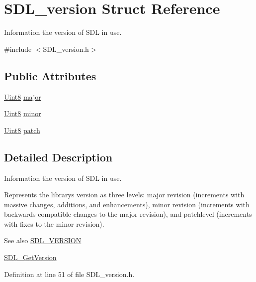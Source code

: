\hypertarget{struct_s_d_l__version}{}\section{S\+D\+L\+\_\+version Struct Reference}
\label{struct_s_d_l__version}


Information the version of S\+DL in use.  




{\ttfamily \#include $<$S\+D\+L\+\_\+version.\+h$>$}

\subsection*{Public Attributes}
\begin{DoxyCompactItemize}
\item 
\mbox{\hyperlink{_s_d_l__stdinc_8h_a2944638813a090aa23e62f4da842c3e2}{Uint8}} \mbox{\hyperlink{struct_s_d_l__version_ad7d7674532073eed237b90f546c97cd0}{major}}
\item 
\mbox{\hyperlink{_s_d_l__stdinc_8h_a2944638813a090aa23e62f4da842c3e2}{Uint8}} \mbox{\hyperlink{struct_s_d_l__version_a6c35c7bf80245028d5970e6a504ecf57}{minor}}
\item 
\mbox{\hyperlink{_s_d_l__stdinc_8h_a2944638813a090aa23e62f4da842c3e2}{Uint8}} \mbox{\hyperlink{struct_s_d_l__version_aa6dacff18edee8cd037c773b843be0f1}{patch}}
\end{DoxyCompactItemize}


\subsection{Detailed Description}
Information the version of S\+DL in use. 

Represents the library\textquotesingle{}s version as three levels\+: major revision (increments with massive changes, additions, and enhancements), minor revision (increments with backwards-\/compatible changes to the major revision), and patchlevel (increments with fixes to the minor revision).

\begin{DoxySeeAlso}{See also}
\mbox{\hyperlink{_s_d_l__version_8h_a7154bc5c2a95a644b5187e4225cdcbd0}{S\+D\+L\+\_\+\+V\+E\+R\+S\+I\+ON}} 

\mbox{\hyperlink{_s_d_l__version_8h_a4204ecbb600f51ee50515979e60bf8f3}{S\+D\+L\+\_\+\+Get\+Version}} 
\end{DoxySeeAlso}


Definition at line 51 of file S\+D\+L\+\_\+version.\+h.



